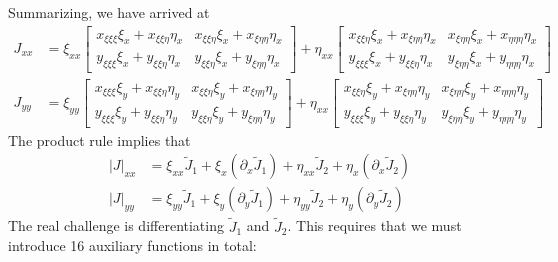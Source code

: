 \documentclass[final,1p,times]{elsarticle}
\begin{document}
Summarizing, we have arrived at
\begin{subequations}
\begin{align}
J_{xx}	&= \xi_{xx}\begin{bmatrix} x_{\xi\xi\xi}\xi_x+x_{\xi\xi\eta}\eta_x & x_{\xi\xi\eta}\xi_x+x_{\xi\eta\eta}\eta_x \\ y_{\xi\xi\xi}\xi_x+y_{\xi\xi\eta}\eta_x & y_{\xi\xi\eta}\xi_x+y_{\xi\eta\eta}\eta_x \end{bmatrix} + \eta_{xx}\begin{bmatrix} x_{\xi\xi\eta}\xi_x+x_{\xi\eta\eta}\eta_x & x_{\xi\eta\eta}\xi_x+x_{\eta\eta\eta}\eta_x \\ y_{\xi\xi\xi}\xi_x+y_{\xi\xi\eta}\eta_x  & y_{\xi\eta\eta}\xi_x+y_{\eta\eta\eta}\eta_x \end{bmatrix} \\
J_{yy}	&= \xi_{yy}\begin{bmatrix} x_{\xi\xi\xi}\xi_y+x_{\xi\xi\eta}\eta_y & x_{\xi\xi\eta}\xi_y+x_{\xi\eta\eta}\eta_y \\ y_{\xi\xi\xi}\xi_y+y_{\xi\xi\eta}\eta_y & y_{\xi\xi\eta}\xi_y+y_{\xi\eta\eta}\eta_y \end{bmatrix} + \eta_{xx}\begin{bmatrix} x_{\xi\xi\eta}\xi_y+x_{\xi\eta\eta}\eta_y & x_{\xi\eta\eta}\xi_y+x_{\eta\eta\eta}\eta_y \\ y_{\xi\xi\xi}\xi_y+y_{\xi\xi\eta}\eta_y  & y_{\xi\eta\eta}\xi_y+y_{\eta\eta\eta}\eta_y \end{bmatrix}
\end{align}
\end{subequations}
The product rule implies that 
\begin{align*}
|J|_{xx}	&= \xi_{xx}\widetilde{J}_1+\xi_x(\partial_x\widetilde{J}_1)+\eta_{xx}\widetilde{J}_2+\eta_x(\partial_x\widetilde{J}_2) \\ 
|J|_{yy}	&= \xi_{yy}\widetilde{J}_1+\xi_y(\partial_y\widetilde{J}_1)+\eta_{yy}\widetilde{J}_2+\eta_y(\partial_y\widetilde{J}_2)
\end{align*}
The real challenge is differentiating $\widetilde{J}_1$ and $\widetilde{J}_2$. This requires that we must introduce 16 auxiliary functions in total:
\end{document}
